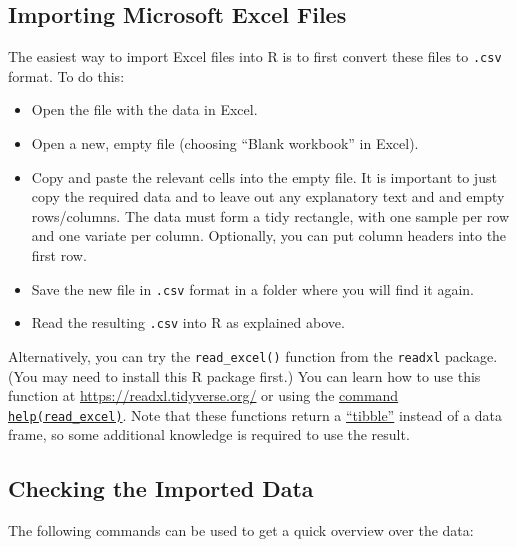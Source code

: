 \documentclass[
  a4paper,
]{article}
\theoremstyle{definition}
\theoremstyle{definition}
\theoremstyle{definition}
\theoremstyle{definition}
\theoremstyle{remark}
\begin{document}
\hypertarget{importing-microsoft-excel-files}{%
\subsection*{Importing Microsoft Excel Files}\label{importing-microsoft-excel-files}}

The easiest way to import Excel files into R is to first convert these
files to \texttt{.csv} format. To do this:

\begin{itemize}
\item
  Open the file with the data in Excel.
\item
  Open a new, empty file (choosing ``Blank workbook'' in Excel).
\item
  Copy and paste the relevant cells into the empty file. It is
  important to just copy the required data and to leave out any
  explanatory text and and empty rows/columns. The data must form a
  tidy rectangle, with one sample per row and one variate per
  column. Optionally, you can put column headers into the first row.
\item
  Save the new file in \texttt{.csv} format
  in a folder where you will find it again.
\item
  Read the resulting \texttt{.csv} into R as explained above.
\end{itemize}

Alternatively, you can try the \texttt{read\_excel()} function from the \texttt{readxl}
package. (You may need to install this R package first.) You can learn how to
use this function at
\url{https://readxl.tidyverse.org/} or using the
\href{https://rdrr.io/cran/readxl/man/read_excel.html}{command \texttt{help(read\_excel)}}.
Note that these functions return a \href{https://tibble.tidyverse.org/}{``tibble''}
instead of a data frame, so some additional knowledge is required to use the
result.

\hypertarget{checking-the-imported-data}{%
\subsection*{Checking the Imported Data}\label{checking-the-imported-data}}

The following commands can be used to get a quick overview over the data:
\end{document}
